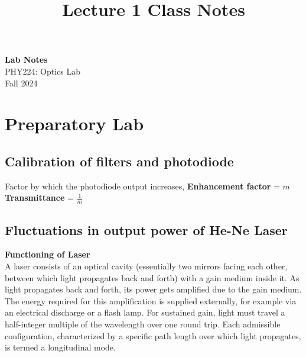 \documentclass[11pt]{article}
\theoremstyle{definition}
\begin{document}
\setcounter{section}{0}
\title{Lecture 1 Class Notes}

\thispagestyle{empty}

\begin{center}
{\LARGE \bf Lab Notes}\\
{\large PHY224: Optics Lab}\\
Fall 2024
\end{center}


\tableofcontents


\section{Preparatory Lab}
\subsection{Calibration of filters and photodiode}
Factor by which the photodiode output increases, \textbf{Enhancement factor} = $m$ \\[10pt]
\textbf{Transmittance} = $\frac{1}{m}$

\subsection{Fluctuations in output power of He-Ne Laser}
\textbf{Functioning of Laser}\\
A laser consists of an optical cavity (essentially two mirrors facing each other, between which light propagates back and forth) with a gain medium inside it. As light propagates back and forth, its power gets amplified due to the gain medium. The energy required for this amplification is supplied externally, for example via an electrical discharge or a flash lamp. For sustained
gain, light must travel a half-integer multiple of the wavelength over one round trip. Each admissible configuration, characterized by a specific path length over which light propagates, is termed a longitudinal mode.
\end{document}
